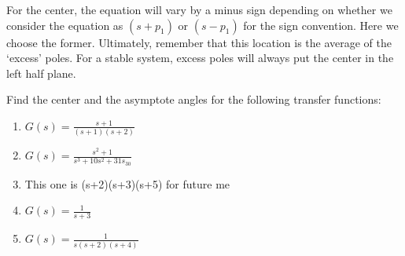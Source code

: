 For the center, the equation will vary by a minus sign depending on whether we consider the equation as $(s+p_1)$ or $(s-p_1)$ for the sign convention. Here we choose the former. Ultimately, remember that this location is the average of the `excess' poles. For a stable system, excess poles will always put the center in the left half plane.
\begin{exercise}\label{exer:asmypote_angle}
Find the center and the asymptote angles for the following transfer functions:
\begin{enumerate}
    \item $G(s)=\frac{s+1}{(s+1)(s+2)}$
    \item $G(s)=\frac{s^2+1}{s^3+10s^2+31s_30}$
    \item This one is (s+2)(s+3)(s+5) for future me
    \item $G(s)=\frac{1}{s+3}$
    \item $G(s)=\frac{1}{s(s+2)(s+4)}$
\end{enumerate}
\end{exercise}


